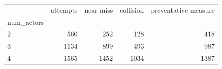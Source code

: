 \begin{tabular}{lrrrr}
\toprule
 & attempts & near miss & collision & preventative measure \\
num_actors &  &  &  &  \\
\midrule
2 & 560 & 252 & 128 & 418 \\
3 & 1134 & 899 & 493 & 987 \\
4 & 1565 & 1452 & 1034 & 1387 \\
\bottomrule
\end{tabular}
